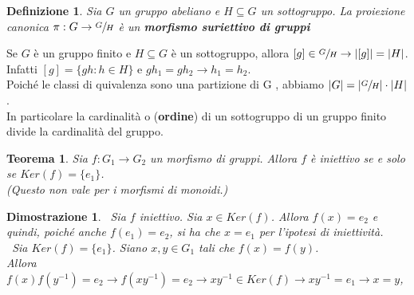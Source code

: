 \documentclass[a4paper,12pt]{article}
\theoremstyle{def}
\newtheorem*{definition}{Definizione}
\theoremstyle{prop}
\theoremstyle{esempio}
\theoremstyle{dimostrazione}
\newtheorem*{dimostrazione}{Dimostrazione}
\theoremstyle{teo}
\newtheorem*{teorema}{Teorema}
\theoremstyle{osservazione}
\begin{document}
\begin{definition}
    Sia \(G\) un gruppo abeliano e \(H \subseteq G\) un sottogruppo. La proiezione canonica \(\pi : G \rightarrow \sfrac{G}{H}\)
    è un \textbf{morfismo suriettivo di gruppi}
\end{definition}

Se \(G\) è un gruppo finito e \(H \subseteq G\) è un sottogruppo, allora \([g] \in \sfrac{G}{H} \rightarrow |[g]| = |H|\).\\
Infatti \([g] = \{gh : h \in  H\}\) e \(gh_1 = gh_2 \rightarrow h_1 = h_2\).\\
Poiché le classi di quivalenza sono una partizione di G , abbiamo \(|G| = |\sfrac{G}{H}| \cdot |H|\).\\
In particolare la cardinalità o (\textbf{ordine}) di un sottogruppo di un gruppo finito divide la cardinalità del gruppo.\\

\begin{teorema}
    Sia \(f : G_1 \rightarrow G_2\) un morfismo di gruppi. Allora \(f\) è iniettivo se e solo se \(Ker(f) = \{e_1\}\).\\
    (Questo non vale per i morfismi di monoidi.)
\end{teorema}

\begin{dimostrazione}
    \
    Sia \(f\) iniettivo. Sia \(x \in Ker(f)\). Allora \(f(x) = e_2\) e quindi, poiché anche \(f(e_1) = e_2\), si ha che \(x = e_1\)
    per l'ipotesi di iniettività.\\\
    Sia \(Ker(f) = \{e_1\}\). Siano \(x,y \in G_1\) tali che \(f(x) = f(y)\).\\
    Allora \(f(x)f(y^{-1}) = e_2 \rightarrow  f(xy^{-1}) = e_2 \rightarrow  xy^{-1} \in Ker(f) \rightarrow xy^{-1} = e_1 \rightarrow
    x=y\),
\end{dimostrazione}
\end{document}

